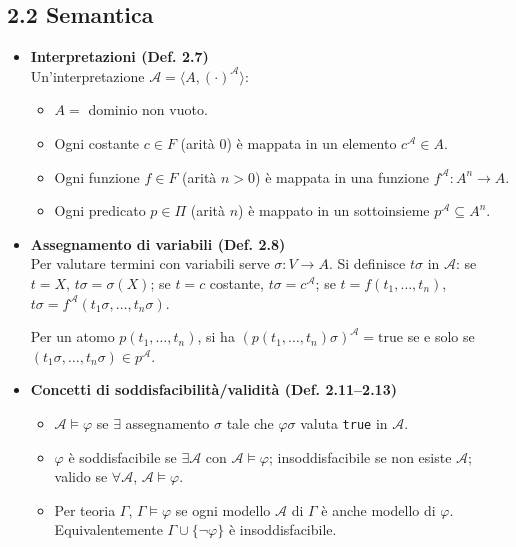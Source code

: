 \documentclass[12pt]{article}
\begin{document}
\subsection*{2.2 Semantica}

\begin{itemize}
  \item \textbf{Interpretazioni (Def. 2.7)}\\
    Un’interpretazione $\mathcal{A} = \langle A,(\cdot)^\mathcal{A}\rangle$:
    \begin{itemize}
      \item $A =$ dominio non vuoto.
      \item Ogni costante $c\in F$ (arità 0) è mappata in un elemento $c^\mathcal{A}\in A$.
      \item Ogni funzione $f\in F$ (arità $n>0$) è mappata in una funzione $f^\mathcal{A}:A^n \to A$.
      \item Ogni predicato $p\in \Pi$ (arità $n$) è mappato in un sottoinsieme $p^\mathcal{A}\subseteq A^n$.
    \end{itemize}

  \item \textbf{Assegnamento di variabili (Def. 2.8)}\\
    Per valutare termini con variabili serve $\sigma:V \to A$. Si definisce $t\sigma$ in $\mathcal{A}$: se $t=X$, $t\sigma=\sigma(X)$; se $t=c$ costante, $t\sigma=c^\mathcal{A}$; se $t=f(t_1,\dots,t_n)$, $t\sigma = f^\mathcal{A}(t_1\sigma, \dots, t_n\sigma)$.

    Per un atomo $p(t_1,\dots,t_n)$, si ha $(p(t_1,\dots,t_n)\sigma)^\mathcal{A} = \text{true}$ se e solo se $(t_1\sigma,\dots,t_n\sigma)\in p^\mathcal{A}$.

  \item \textbf{Concetti di soddisfacibilità/validità (Def. 2.11–2.13)}\\
    \begin{itemize}
      \item $\mathcal{A}\models \varphi$ se $\exists$ assegnamento $\sigma$ tale che $\varphi\sigma$ valuta \texttt{true} in $\mathcal{A}$.
      \item $\varphi$ è soddisfacibile se $\exists \mathcal{A}$ con $\mathcal{A}\models \varphi$; insoddisfacibile se non esiste $\mathcal{A}$; valido se $\forall \mathcal{A}$, $\mathcal{A}\models \varphi$.
      \item Per teoria $\Gamma$, $\Gamma\models \varphi$ se ogni modello $\mathcal{A}$ di $\Gamma$ è anche modello di $\varphi$. Equivalentemente $\Gamma\cup\{\neg\varphi\}$ è insoddisfacibile.
    \end{itemize}


\end{itemize}
\end{document}
